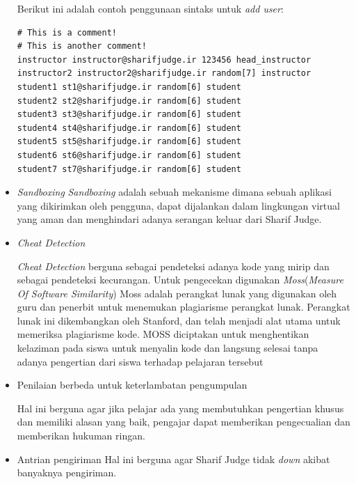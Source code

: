 \begin{itemize}
    Berikut ini adalah contoh penggunaan sintaks untuk \textit{add user}:
 \begin{lstlisting}[basicstyle=\ttfamily, frame=single,
    columns=fullflexible, breaklines=true, numbers=none]
# This is a comment!
# This is another comment!
instructor instructor@sharifjudge.ir 123456 head_instructor
instructor2 instructor2@sharifjudge.ir random[7] instructor
student1 st1@sharifjudge.ir random[6] student
student2 st2@sharifjudge.ir random[6] student
student3 st3@sharifjudge.ir random[6] student
student4 st4@sharifjudge.ir random[6] student
student5 st5@sharifjudge.ir random[6] student
student6 st6@sharifjudge.ir random[6] student
student7 st7@sharifjudge.ir random[6] student
    \end{lstlisting}

    \item \textit{Sandboxing}\newline
        \textit{Sandboxing} adalah sebuah mekanisme dimana sebuah aplikasi yang dikirimkan oleh pengguna, dapat dijalankan dalam lingkungan virtual yang aman dan menghindari adanya serangan keluar dari Sharif Judge. \\
        
    \item \textit{Cheat Detection}
    
    \textit{Cheat Detection} berguna sebagai pendeteksi adanya kode yang mirip dan sebagai pendeteksi kecurangan. Untuk pengecekan digunakan \textit{Moss}(\textit{Measure Of Software Similarity}) Moss adalah perangkat lunak yang digunakan oleh guru dan penerbit untuk menemukan plagiarisme perangkat lunak. Perangkat lunak ini dikembangkan oleh Stanford, dan telah menjadi alat utama untuk memeriksa plagiarisme kode. MOSS diciptakan untuk menghentikan kelaziman pada siswa untuk menyalin kode dan langsung selesai tanpa adanya pengertian dari siswa terhadap pelajaran tersebut\cite{moss} \\
    \item Penilaian berbeda untuk keterlambatan pengumpulan
    
    Hal ini berguna agar jika pelajar ada yang membutuhkan pengertian khusus dan memiliki alasan yang baik, pengajar dapat memberikan pengecualian dan memberikan hukuman ringan.\\
    \item Antrian pengiriman \newline
    Hal ini berguna agar Sharif Judge tidak \textit{down} akibat banyaknya pengiriman.\\
    

\end{itemize}
